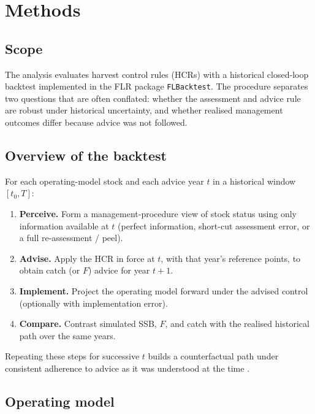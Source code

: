 
\section{Methods}
\label{sec:methods-backtest}

\subsection{Scope}

The analysis evaluates harvest control rules (HCRs) with a historical
closed-loop backtest implemented in the FLR package \texttt{FLBacktest}.
The procedure separates two questions that are often conflated: whether the
assessment and advice rule are robust under historical uncertainty, and
whether realised management outcomes differ because advice was not followed.

\subsection{Overview of the backtest}

For each operating-model stock and each advice year \(t\) in a historical
window \([t_0,T]\):
\begin{enumerate}
  \item \textbf{Perceive.} Form a management-procedure view of stock status
        using only information available at \(t\) (perfect information,
        short-cut assessment error, or a full re-assessment / peel).
  \item \textbf{Advise.} Apply the HCR in force at \(t\), with that year's
        reference points, to obtain catch (or \(F\)) advice for year
        \(t{+}1\).
  \item \textbf{Implement.} Project the operating model forward under the
        advised control (optionally with implementation error).
  \item \textbf{Compare.} Contrast simulated SSB, \(F\), and catch with the
        realised historical path over the same years.
\end{enumerate}
Repeating these steps for successive \(t\) builds a counterfactual path under
consistent adherence to advice as it was understood at the time
\citep{Punt2016MSE,Butterworth2014}.

\subsection{Operating model}

